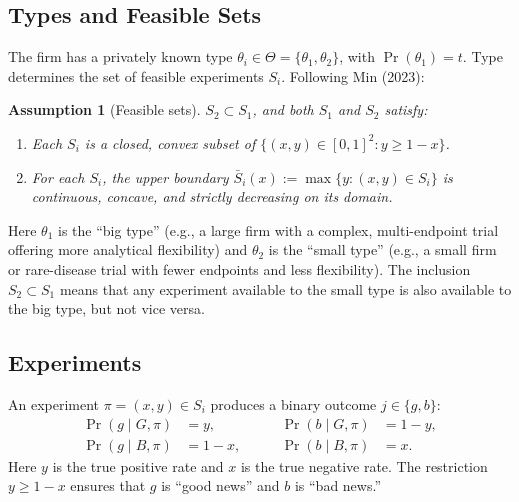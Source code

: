 \documentclass[12pt,a4paper]{article}
\newtheorem{assumption}{Assumption}
\begin{document}
\subsection{Types and Feasible Sets}

The firm has a privately known type
$\theta_i \in \Theta = \{\theta_1, \theta_2\}$, with
$\Pr(\theta_1) = t$. Type determines the set of feasible
experiments $S_i$. Following Min (2023):

\begin{assumption}[Feasible sets]\label{as:feasible}
$S_2 \subset S_1$, and both $S_1$ and $S_2$ satisfy:
\begin{enumerate}
  \item[(i)] Each $S_i$ is a closed, convex subset of
    $\{(x, y) \in [0,1]^2 : y \geq 1 - x\}$.
  \item[(ii)] For each $S_i$, the upper boundary
    $\bar{S}_i(x) := \max\{y : (x,y) \in S_i\}$ is
    continuous, concave, and strictly decreasing on its
    domain.
\end{enumerate}
\end{assumption}

Here $\theta_1$ is the ``big type'' (e.g., a large firm with
a complex, multi-endpoint trial offering more analytical
flexibility) and $\theta_2$ is the ``small type'' (e.g., a
small firm or rare-disease trial with fewer endpoints and less
flexibility). The inclusion $S_2 \subset S_1$ means that any
experiment available to the small type is also available to the
big type, but not vice versa.


\subsection{Experiments}

An experiment $\pi = (x, y) \in S_i$ produces a binary outcome
$j \in \{g, b\}$:
\begin{equation}\label{eq:experiment}
\begin{aligned}
  \Pr(g \mid G, \pi) &= y,
    &\qquad \Pr(b \mid G, \pi) &= 1 - y, \\
  \Pr(g \mid B, \pi) &= 1 - x,
    &\qquad \Pr(b \mid B, \pi) &= x.
\end{aligned}
\end{equation}
Here $y$ is the true positive rate and $x$ is the true
negative rate. The restriction $y \geq 1 - x$ ensures that $g$
is ``good news'' and $b$ is ``bad news.''
\end{document}

